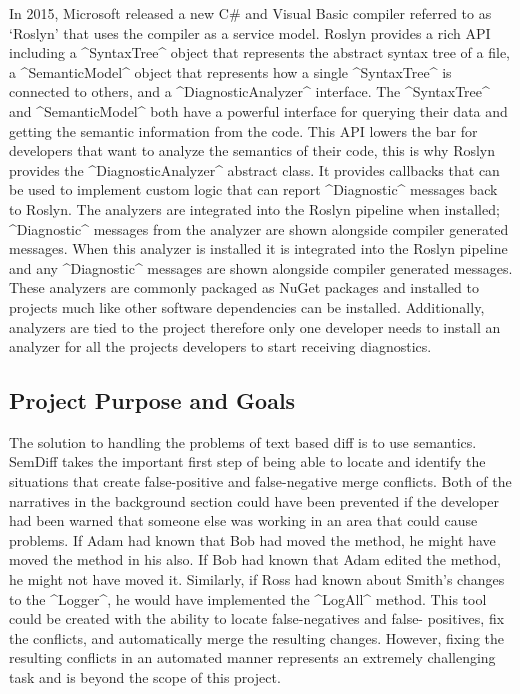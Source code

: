 \documentclass[draftclsnofoot,onecolumn]{IEEEtran}
\begin{document}
In 2015, Microsoft released a new C\# and Visual Basic compiler referred to as 
`Roslyn' that uses the compiler as a service model. Roslyn provides a rich API 
including a ^SyntaxTree^ object that represents the abstract syntax tree of a 
file, a ^SemanticModel^ object that represents how a single ^SyntaxTree^ is 
connected to others, and a ^DiagnosticAnalyzer^ interface. The ^SyntaxTree^ 
and ^SemanticModel^ both have a powerful interface for querying their data and 
getting the semantic information from the code. This API lowers the bar for 
developers that want to analyze the semantics of their code, this is why 
Roslyn provides the ^DiagnosticAnalyzer^ abstract class. It provides callbacks 
that can be used to implement custom logic that can report ^Diagnostic^ 
messages back to Roslyn. The analyzers are integrated into the Roslyn pipeline 
when installed; ^Diagnostic^ messages from the analyzer are shown alongside 
compiler generated messages. When this analyzer is installed it is integrated 
into the Roslyn pipeline and any ^Diagnostic^ messages are shown alongside 
compiler generated messages. These analyzers are commonly packaged as NuGet 
packages and installed to projects much like other software dependencies can 
be installed. Additionally, analyzers are tied to the project therefore only 
one developer needs to install an analyzer for all the projects developers to 
start receiving diagnostics.

\subsection{Project Purpose and Goals}%

The solution to handling the problems of text based diff is to use semantics. 
SemDiff takes the important first step of being able to locate and identify 
the situations that create false-positive and false-negative merge conflicts. 
Both of the narratives in the background section could have been prevented if 
the developer had been warned that someone else was working in an area that 
could cause problems. If Adam had known that Bob had moved the method, he 
might have moved the method in his also. If Bob had known that Adam edited the 
method, he might not have moved it. Similarly, if Ross had known about Smith's 
changes to the ^Logger^, he would have implemented the ^LogAll^ method. This 
tool could be created with the ability to locate false-negatives and false-
positives, fix the conflicts, and automatically merge the resulting changes. 
However, fixing the resulting conflicts in an automated manner represents an 
extremely challenging task and is beyond the scope of this project.
\end{document}
